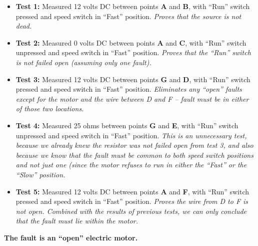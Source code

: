 \vfil 

\eject






\begin{itemize}
\item{} {\bf Test 1:} Measured 12 volts DC between points {\bf A} and {\bf B}, with ``Run'' switch pressed and speed switch in ``Fast'' position.  {\it Proves that the source is not dead.}
\vskip 5pt
\item{} {\bf Test 2:} Measured 0 volts DC between points {\bf A} and {\bf C}, with ``Run'' switch unpressed and speed switch in ``Fast'' position.  {\it Proves that the ``Run'' switch is not failed open (assuming only one fault).}
\vskip 5pt
\item{} {\bf Test 3:} Measured 12 volts DC between points {\bf G} and {\bf D}, with ``Run'' switch pressed and speed switch in ``Fast'' position.  {\it Eliminates any ``open'' faults except for the motor and the wire between D and F -- fault must be in either of those two locations.}
\vskip 5pt
\item{} {\bf Test 4:} Measured 25 ohms between points {\bf G} and {\bf E}, with ``Run'' switch unpressed and speed switch in ``Fast'' position.  {\it This is an unnecessary test, because we already knew the resistor was not failed open from test 3, and also because we know that the fault must be common to both speed switch positions and not just one (since the motor refuses to run in either the ``Fast'' or the ``Slow'' position.} 
\vskip 5pt
\item{} {\bf Test 5:} Measured 12 volts DC between points {\bf A} and {\bf F}, with ``Run'' switch pressed and speed switch in ``Fast'' position.  {\it Proves the wire from D to F is not open.  Combined with the results of previous tests, we can only conclude that the fault must lie within the motor.}
\end{itemize}

\vskip 10pt

{\bf The fault is an ``open'' electric motor.}











